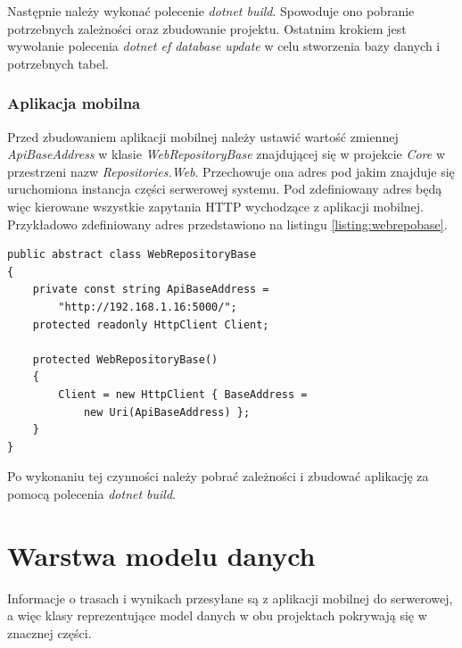 Następnie należy wykonać polecenie \textit{dotnet build}. Spowoduje ono pobranie potrzebnych zależności oraz zbudowanie projektu. Ostatnim krokiem jest wywołanie polecenia \textit{dotnet ef database update} w celu stworzenia bazy danych i potrzebnych tabel.

\subsubsection{Aplikacja mobilna}
Przed zbudowaniem aplikacji mobilnej należy ustawić wartość zmiennej \textit{ApiBaseAddress} w klasie \textit{WebRepositoryBase} znajdującej się w projekcie \textit{Core} w przestrzeni nazw \textit{Repositories.Web}. Przechowuje ona adres pod jakim znajduje się uruchomiona instancja części serwerowej systemu. Pod zdefiniowany adres będą więc kierowane wszystkie zapytania HTTP wychodzące z aplikacji mobilnej. Przykładowo zdefiniowany adres przedstawiono na listingu \ref{listing:webrepobase}.

\begin{lstlisting}[caption={Klasa zawierająca adres aplikacji serwerowej},label=listing:webrepobase]
public abstract class WebRepositoryBase
{
	private const string ApiBaseAddress = 
		"http://192.168.1.16:5000/";
	protected readonly HttpClient Client;

	protected WebRepositoryBase()
	{
		Client = new HttpClient { BaseAddress =
			new Uri(ApiBaseAddress) };
	}
}
\end{lstlisting}

Po wykonaniu tej czynności należy pobrać zależności i zbudować aplikację za pomocą polecenia \textit{dotnet build}.


\section{Warstwa modelu danych}
Informacje o trasach i wynikach przesyłane są z aplikacji mobilnej do serwerowej, a więc klasy reprezentujące model danych w obu projektach pokrywają się w znacznej części.

